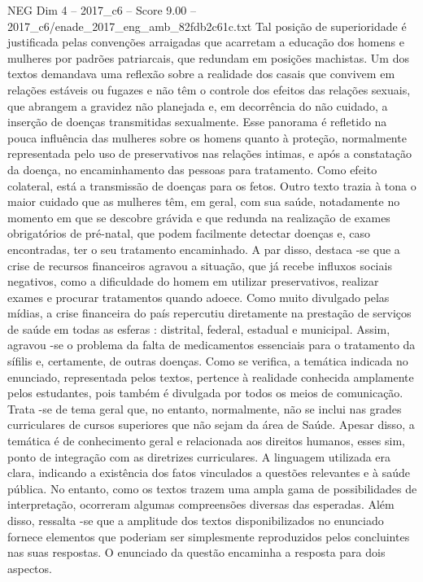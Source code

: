 \begin{textsample}{NEG Dim 4 – 2017\_c6 – Score 9.00 – 2017\_c6/enade\_2017\_eng\_amb\_82fdb2c61c.txt}
Tal posição de superioridade é justificada pelas convenções arraigadas que acarretam a educação dos homens e mulheres por padrões patriarcais, que redundam em posições machistas.
Um dos textos demandava uma reflexão sobre a realidade dos casais que convivem em relações estáveis ou fugazes e não têm o controle dos efeitos das relações sexuais, que abrangem a gravidez não planejada e, em decorrência do não cuidado, a inserção de doenças transmitidas sexualmente.
Esse panorama é refletido na pouca influência das mulheres sobre os homens quanto à proteção, normalmente representada pelo uso de preservativos nas relações intimas, e após a constatação da doença, no encaminhamento das pessoas para tratamento.
Como efeito colateral, está a transmissão de doenças para os fetos.
Outro texto trazia à tona o maior cuidado que as mulheres têm, em geral, com sua saúde, notadamente no momento em que se descobre grávida e que redunda na realização de exames obrigatórios de pré-natal, que podem facilmente detectar doenças e, caso encontradas, ter o seu tratamento encaminhado.
A par disso, destaca -se que a crise de recursos financeiros agravou a situação, que já recebe influxos sociais negativos, como a dificuldade do homem em utilizar preservativos, realizar exames e procurar tratamentos quando adoece.
Como muito divulgado pelas mídias, a crise financeira do país repercutiu diretamente na prestação de serviços de saúde em todas as esferas : distrital, federal, estadual e municipal.
Assim, agravou -se o problema da falta de medicamentos essenciais para o tratamento da sífilis e, certamente, de outras doenças.
Como se verifica, a temática indicada no enunciado, representada pelos textos, pertence à realidade conhecida amplamente pelos estudantes, pois também é divulgada por todos os meios de comunicação.
Trata -se de tema geral que, no entanto, normalmente, não se inclui nas grades curriculares de cursos superiores que não sejam da área de Saúde.
Apesar disso, a temática é de conhecimento geral e relacionada aos direitos humanos, esses sim, ponto de integração com as diretrizes curriculares.
A linguagem utilizada era clara, indicando a existência dos fatos vinculados a questões relevantes e à saúde pública.
No entanto, como os textos trazem uma ampla gama de possibilidades de interpretação, ocorreram algumas compreensões diversas das esperadas.
Além disso, ressalta -se que a amplitude dos textos disponibilizados no enunciado fornece elementos que poderiam ser simplesmente reproduzidos pelos concluintes nas suas respostas.
O enunciado da questão encaminha a resposta para dois aspectos.

\end{textsample}
